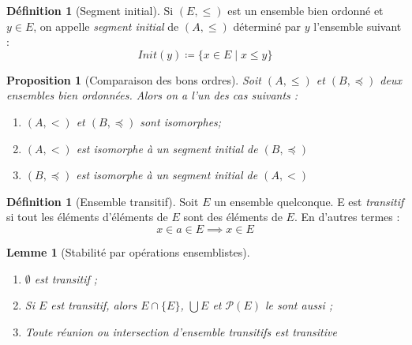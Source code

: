 \documentclass{article}
\theoremstyle{definition}
\newtheorem{definition}[subsubsection]{Définition}
\theoremstyle{plain}
\newtheorem{proposition}[subsubsection]{Proposition}
\theoremstyle{plain}
\theoremstyle{plain}
\newtheorem{lemma}[subsubsection]{Lemme}
\theoremstyle{plain}
\begin{document}
\begin{definition}[Segment initial]
	Si \( (E,\le) \) est un ensemble bien ordonné et \( y \in E\), on appelle \textit{segment initial} de \( (A,\le) \) déterminé par \( y \) l'ensemble suivant :
	\begin{equation*}
		Init(y) \coloneqq \{ x \in E \mid x \le y \}
	\end{equation*}
\end{definition}

\begin{proposition}[Comparaison des bons ordres]
	Soit \( (A,\le) \) et \( (B,\preceq) \) deux ensembles bien ordonnées. Alors on a l'un des cas suivants :
	\begin{enumerate}[label = (\roman*)]
		\item \( (A,<) \) et \( (B,\preceq) \) sont isomorphes;
		\item \( (A,<) \) est isomorphe à un segment initial de \( (B,\preceq) \)
		\item \( (B,\preceq) \) est isomorphe à un segment initial de \( (A,<) \)
	\end{enumerate}
\end{proposition}

\begin{definition}[Ensemble transitif]
	Soit \( E \) un ensemble quelconque. E est \textit{transitif} si tout les éléments d'éléments de \( E \) sont des éléments de \( E \). En d'autres termes :
	\begin{equation}\label{eq:Tr} \tag{Tr}
		x \in a \in E \implies x \in E 
	\end{equation}
\end{definition}

\begin{lemma}[Stabilité par opérations ensemblistes]
	\begin{enumerate}[label = (\roman*)]
		\item \( \emptyset \) est transitif ;
		\item Si \( E \) est transitif, alors \( E \cap \{E\} \), \( \bigcup E \) et \( \mathcal{P}(E) \) le sont aussi ;
		\item Toute réunion ou intersection d'ensemble transitifs est transitive
	\end{enumerate}
\end{lemma}
\end{document}
